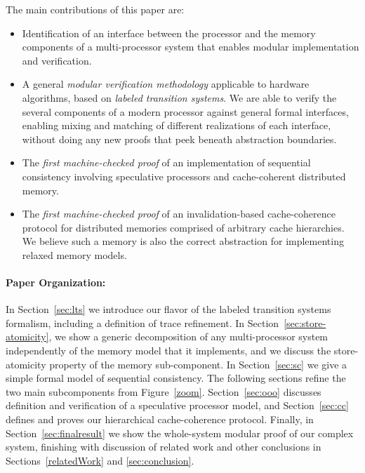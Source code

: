 The main contributions of this paper are:

\begin{itemize} 
\item Identification of an interface between the processor and the memory
components of a multi-processor system that enables modular implementation and
verification.

\item A general \emph{modular verification methodology} applicable to hardware
  algorithms, based on \emph{labeled transition systems}.
We are able to verify
  the several components of a modern processor 
against general formal interfaces,
  enabling mixing and matching of different realizations of each interface,
  without doing any new proofs that peek beneath abstraction boundaries.

\item The \emph{first machine-checked proof} of an implementation of sequential
  consistency involving speculative processors and cache-coherent distributed
  memory.

\item The \emph{first machine-checked proof} of an invalidation-based
  cache-coherence protocol for distributed memories comprised of arbitrary
  cache hierarchies. We believe such a memory is also the correct abstraction for
  implementing relaxed memory models.
\end{itemize}

\paragraph{Paper Organization:} In Section~\ref{sec:lts} we introduce our
flavor of the labeled transition systems formalism, including a definition of
trace refinement. In Section~\ref{sec:store-atomicity}, we show a generic
decomposition of any multi-processor system independently of the memory model
that it implements, and we discuss the store-atomicity property of the memory
sub-component. In Section~\ref{sec:sc} we
give a simple formal model of sequential consistency.  The
following sections refine the two main subcomponents from Figure~\ref{zoom}.
Section~\ref{sec:ooo} discusses definition and verification of a speculative
processor model, and Section~\ref{sec:cc}
defines and proves our hierarchical cache-coherence protocol.  Finally, in
Section~\ref{sec:finalresult} we show the whole-system modular proof of our
complex system, finishing with discussion of related work and other conclusions in
Sections~\ref{relatedWork} and \ref{sec:conclusion}.

